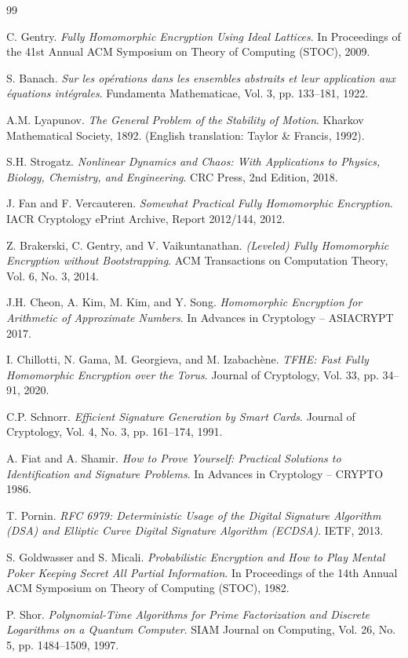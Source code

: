 \documentclass{article}
\begin{document}
\begin{thebibliography}{99}

 C. Gentry. \textit{Fully Homomorphic Encryption Using Ideal Lattices}. In Proceedings of the 41st Annual ACM Symposium on Theory of Computing (STOC), 2009.

 S. Banach. \textit{Sur les op\'erations dans les ensembles abstraits et leur application aux \'equations int\'egrales}. Fundamenta Mathematicae, Vol. 3, pp. 133--181, 1922.

 A.M. Lyapunov. \textit{The General Problem of the Stability of Motion}. Kharkov Mathematical Society, 1892. (English translation: Taylor \& Francis, 1992).

 S.H. Strogatz. \textit{Nonlinear Dynamics and Chaos: With Applications to Physics, Biology, Chemistry, and Engineering}. CRC Press, 2nd Edition, 2018.

 J. Fan and F. Vercauteren. \textit{Somewhat Practical Fully Homomorphic Encryption}. IACR Cryptology ePrint Archive, Report 2012/144, 2012.

 Z. Brakerski, C. Gentry, and V. Vaikuntanathan. \textit{(Leveled) Fully Homomorphic Encryption without Bootstrapping}. ACM Transactions on Computation Theory, Vol. 6, No. 3, 2014.

 J.H. Cheon, A. Kim, M. Kim, and Y. Song. \textit{Homomorphic Encryption for Arithmetic of Approximate Numbers}. In Advances in Cryptology -- ASIACRYPT 2017.

 I. Chillotti, N. Gama, M. Georgieva, and M. Izabach\`ene. \textit{TFHE: Fast Fully Homomorphic Encryption over the Torus}. Journal of Cryptology, Vol. 33, pp. 34--91, 2020.

 C.P. Schnorr. \textit{Efficient Signature Generation by Smart Cards}. Journal of Cryptology, Vol. 4, No. 3, pp. 161--174, 1991.

 A. Fiat and A. Shamir. \textit{How to Prove Yourself: Practical Solutions to Identification and Signature Problems}. In Advances in Cryptology -- CRYPTO 1986.

 T. Pornin. \textit{RFC 6979: Deterministic Usage of the Digital Signature Algorithm (DSA) and Elliptic Curve Digital Signature Algorithm (ECDSA)}. IETF, 2013.

 S. Goldwasser and S. Micali. \textit{Probabilistic Encryption and How to Play Mental Poker Keeping Secret All Partial Information}. In Proceedings of the 14th Annual ACM Symposium on Theory of Computing (STOC), 1982.

 P. Shor. \textit{Polynomial-Time Algorithms for Prime Factorization and Discrete Logarithms on a Quantum Computer}. SIAM Journal on Computing, Vol. 26, No. 5, pp. 1484--1509, 1997.

\end{thebibliography}
\end{document}
